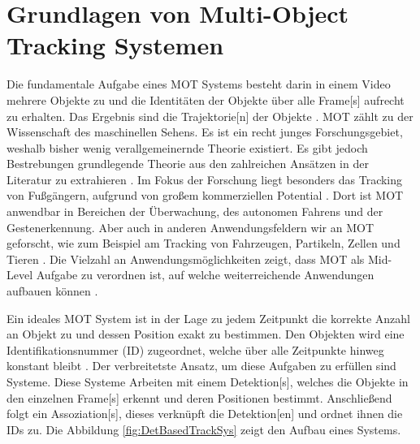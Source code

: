 \section{Grundlagen von Multi-Object Tracking Systemen} \label{sec:Grundlagen von MOT}
Die fundamentale Aufgabe eines \gls{MOT} Systems besteht darin in einem Video mehrere Objekte zu  und die Identitäten der Objekte über alle \gls{Frame}[s] aufrecht zu erhalten. Das Ergebnis sind die \gls{Trajektorie}[n] der Objekte \cite{CLEAR.2008, HOTA, Luo.2022}. \gls{MOT} zählt zu der Wissenschaft des maschinellen Sehens. Es ist ein recht junges Forschungsgebiet, weshalb bisher wenig verallgemeinernde Theorie existiert. Es gibt jedoch Bestrebungen grundlegende Theorie aus den zahlreichen Ansätzen in der Literatur zu extrahieren \cite{Luo.2022}. Im Fokus der Forschung liegt besonders das Tracking von Fußgängern, aufgrund von großem kommerziellen Potential \cite{Luo.2022}. Dort ist \gls{MOT} anwendbar in Bereichen der Überwachung, des autonomen Fahrens und der Gestenerkennung. Aber auch in anderen Anwendungsfeldern wir an \gls{MOT} geforscht, wie zum Beispiel am \gls{Tracking} von Fahrzeugen, Partikeln, Zellen und Tieren \cite{Luo.2022, CLEAR.2008, Crocker.1996}. Die Vielzahl an Anwendungsmöglichkeiten zeigt, dass \gls{MOT} als \gls{Mid-Level Aufgabe} zu verordnen ist, auf welche weiterreichende Anwendungen aufbauen können \cite{Luo.2022}.\par

Ein ideales \gls{MOT} System ist in der Lage zu jedem Zeitpunkt die korrekte Anzahl an Objekt zu  und dessen Position exakt zu bestimmen. Den Objekten wird eine Identifikationsnummer (\acrshort{ID}) zugeordnet, welche über alle Zeitpunkte hinweg konstant bleibt \cite{CLEAR.2008}. Der verbreitetste Ansatz, um diese Aufgaben zu erfüllen sind  Systeme. Diese Systeme  Arbeiten mit einem \gls{Detektion}[s], welches die Objekte in den einzelnen \gls{Frame}[s] erkennt und deren Positionen bestimmt. Anschließend folgt ein \gls{Assoziation}[s], dieses verknüpft die \gls{Detektion}[en] und ordnet ihnen die \acrshort{ID}s zu\cite{Luo.2022}. Die Abbildung \ref{fig:DetBasedTrackSys} zeigt den Aufbau eines  Systems. 


